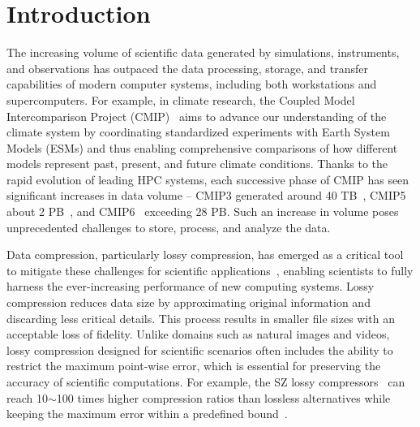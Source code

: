 \section{Introduction}
\label{sec:intro}

The increasing volume of scientific data generated by simulations, instruments, and observations has outpaced the data processing, storage, and transfer capabilities of modern computer systems, including both workstations and supercomputers. 
For example, in climate research, the Coupled Model Intercomparison Project (CMIP)~\cite{cmip} aims to advance our understanding of the climate system by coordinating standardized experiments with Earth System Models (ESMs) and thus enabling comprehensive comparisons of how different models represent past, present, and future climate conditions. Thanks to the rapid evolution of leading HPC systems, each successive phase of CMIP has seen significant increases in data volume -- CMIP3 generated around 40 TB~\cite{cmip-surrogate, cmip6-plan}, CMIP5 about 2 PB~\cite{cmip6-plan}, and CMIP6~\cite{cmip6-dashboard} exceeding 28 PB. Such an increase in volume poses unprecedented challenges to store, process, and analyze the data.

Data compression, particularly lossy compression, has emerged as a critical tool to mitigate these challenges for scientific applications~\cite{sz16, sz17, qoisz, mgard, sperr, zfp, cuZFP, zfp-particle1, zfp-particle2, tthresh}, enabling scientists to fully harness the ever-increasing performance of new computing systems. Lossy compression reduces data size by approximating original information and discarding less critical details. This process results in smaller file sizes with an acceptable loss of fidelity. Unlike domains such as natural images and videos, lossy compression designed for scientific scenarios often includes the ability to restrict the maximum point-wise error, which is essential for preserving the accuracy of scientific computations. For example, the SZ lossy compressors~\cite{interp} can reach 10$\sim$100 times higher compression ratios than lossless alternatives while keeping the maximum error within a predefined bound~\cite{sdrbench}.

